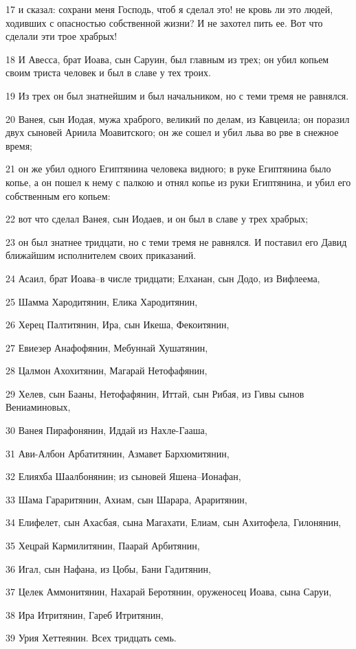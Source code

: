 \par 17 и сказал: сохрани меня Господь, чтоб я сделал это! не кровь ли это людей, ходивших с опасностью собственной жизни? И не захотел пить ее. Вот что сделали эти трое храбрых!
\par 18 И Авесса, брат Иоава, сын Саруин, был главным из трех; он убил копьем своим триста человек и был в славе у тех троих.
\par 19 Из трех он был знатнейшим и был начальником, но с теми тремя не равнялся.
\par 20 Ванея, сын Иодая, мужа храброго, великий по делам, из Кавцеила; он поразил двух сыновей Ариила Моавитского; он же сошел и убил льва во рве в снежное время;
\par 21 он же убил одного Египтянина человека видного; в руке Египтянина было копье, а он пошел к нему с палкою и отнял копье из руки Египтянина, и убил его собственным его копьем:
\par 22 вот что сделал Ванея, сын Иодаев, и он был в славе у трех храбрых;
\par 23 он был знатнее тридцати, но с теми тремя не равнялся. И поставил его Давид ближайшим исполнителем своих приказаний.
\par 24 Асаил, брат Иоава--в числе тридцати; Елханан, сын Додо, из Вифлеема,
\par 25 Шамма Хародитянин, Елика Хародитянин,
\par 26 Херец Палтитянин, Ира, сын Икеша, Фекоитянин,
\par 27 Евиезер Анафофянин, Мебуннай Хушатянин,
\par 28 Цалмон Ахохитянин, Магарай Нетофафянин,
\par 29 Хелев, сын Бааны, Нетофафянин, Иттай, сын Рибая, из Гивы сынов Вениаминовых,
\par 30 Ванея Пирафонянин, Иддай из Нахле-Гааша,
\par 31 Ави-Албон Арбатитянин, Азмавет Бархюмитянин,
\par 32 Елияхба Шаалбонянин; из сыновей Яшена--Ионафан,
\par 33 Шама Гараритянин, Ахиам, сын Шарара, Араритянин,
\par 34 Елифелет, сын Ахасбая, сына Магахати, Елиам, сын Ахитофела, Гилонянин,
\par 35 Хецрай Кармилитянин, Паарай Арбитянин,
\par 36 Игал, сын Нафана, из Цобы, Бани Гадитянин,
\par 37 Целек Аммонитянин, Нахарай Беротянин, оруженосец Иоава, сына Саруи,
\par 38 Ира Итритянин, Гареб Итритянин,
\par 39 Урия Хеттеянин. Всех тридцать семь.

